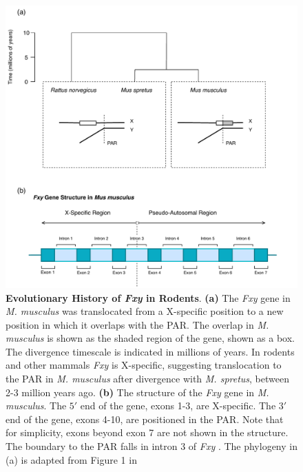 \begin{figure}[htbp]
\centering
\includegraphics[width=\textwidth]{figures/diagrams/Fxy.pdf}
\caption{\textbf{Evolutionary History of \textit{Fxy} in Rodents}. \textbf{(a)} The \textit{Fxy} gene in \textit{M. musculus} was translocated from a X-specific position to a new position in which it overlaps with the PAR. The overlap in \textit{M. musculus} is shown as the shaded region of the gene, shown as a box. The divergence timescale is indicated in millions of years. In rodents and other mammals \textit{Fxy} is X-specific, suggesting translocation to the PAR in \textit{M. musculus} after divergence with \textit{M. spretus}, between 2-3 million years ago. \textbf{(b)} The structure of the \textit{Fxy} gene in \textit{M. musculus}. The $5'$ end of the gene, exons 1-3, are X-specific. The $3'$ end of the gene, exons 4-10, are positioned in the PAR. Note that for simplicity, exons beyond exon 7 are not shown in the structure. The boundary to the PAR falls in intron 3 of \textit{Fxy} \citep{Palmer1997AMice}. The phylogeny in (a) is adapted from Figure 1 in \cite{Galtier2007AdaptationEvolution}}
\label{fig:Fxy}
\end{figure}